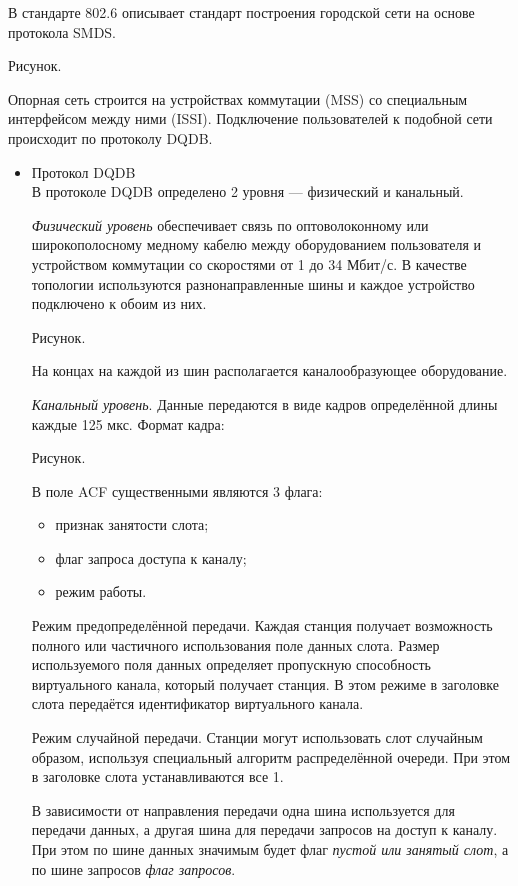 \documentclass[12pt, russian, oneside, article]{ncc}
\begin{document}
В стандарте 802.6 описывает стандарт построения городской сети на основе протокола SMDS.

Рисунок.

Опорная сеть строится на устройствах коммутации (MSS) со специальным интерфейсом между ними (ISSI). Подключение пользователей к подобной сети происходит по протоколу DQDB.
\begin{itemize}

\item Протокол DQDB\\
\label{sec-5_2_4_1}%
В протоколе DQDB определено 2 уровня --- физический и канальный.

\emph{Физический уровень} обеспечивает связь по оптоволоконному или широкополосному медному кабелю между оборудованием пользователя и устройством коммутации со скоростями от 1 до 34 Мбит/с. В качестве топологии используются разнонаправленные шины и каждое устройство подключено к обоим из них.

Рисунок.

На концах на каждой из шин располагается каналообразующее оборудование.

\emph{Канальный уровень}. Данные передаются в виде кадров определённой длины каждые 125 мкс. Формат кадра:

Рисунок.

В поле ACF существенными являются 3 флага:
\begin{itemize}
\item признак занятости слота;
\item флаг запроса доступа к каналу;
\item режим работы.
\end{itemize}
  
Режим предопределённой передачи. Каждая станция получает возможность полного или частичного использования поле данных слота. Размер используемого поля данных определяет пропускную способность виртуального канала, который получает станция. В этом режиме в заголовке слота передаётся идентификатор виртуального канала.

Режим случайной передачи. Станции могут использовать слот случайным образом, используя специальный алгоритм распределённой очереди. При этом в заголовке слота устанавливаются все 1.

В зависимости от направления передачи одна шина используется для передачи данных, а другая шина для передачи запросов на доступ к каналу. При этом по шине данных значимым будет флаг \emph{пустой или занятый слот}, а по шине запросов \emph{флаг запросов}.


\end{itemize}
\end{document}
